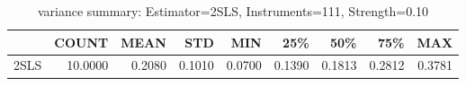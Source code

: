 \begin{table}[ht]
\centering
\caption{variance summary: Estimator=2SLS, Instruments=111, Strength=0.10}
\begin{tabular}{lrrrrrrrr}
\toprule
 & COUNT & MEAN & STD & MIN & 25\% & 50\% & 75\% & MAX \\
\midrule
2SLS & 10.0000 & 0.2080 & 0.1010 & 0.0700 & 0.1390 & 0.1813 & 0.2812 & 0.3781 \\
\bottomrule
\end{tabular}
\end{table}
